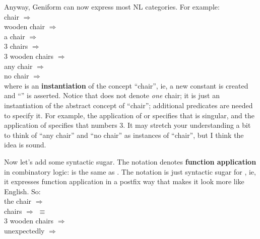 Anyway, Geniform can now express most NL categories.  For example:\\
\hspace*{1cm} chair $\Longrightarrow$ \\
\hspace*{1cm} wooden chair $\Longrightarrow$ \\
\hspace*{1cm} a chair $\Longrightarrow$ \\
\hspace*{1cm} 3 chairs $\Longrightarrow$ \\
\hspace*{1cm} 3 wooden chairs $\Longrightarrow$ \\
\hspace*{1cm} any chair $\Longrightarrow$ \\
\hspace*{1cm} no chair $\Longrightarrow$ \\
where  is an \textbf{instantiation} of the concept ``chair'', ie, a new constant  is created and ``'' is asserted.  Notice that  does not denote \textit{one} chair; it is just an instantiation of the abstract concept of ``chair''; additional predicates are needed to specify it.  For example, the application of  or  specifies that  is singular, and the application of  specifies that  numbers 3.  It may stretch your understanding a bit to think of ``any chair'' and ``no chair'' as instances of ``chair'', but I think the idea is sound.

Now let's add some syntactic sugar.  The notation  denotes \textbf{function application} in combinatory logic:   is the same as .  The notation  is just syntactic sugar for , ie, it expresses function application in a postfix way that makes it look more like English.  So:\\
\hspace*{1cm} the chair $\Longrightarrow$ \\
\hspace*{1cm} chairs $\Longrightarrow$  $\equiv$ \\
\hspace*{1cm} 3 wooden chairs $\Longrightarrow$ \\
\hspace*{1cm} unexpectedly $\Longrightarrow$ 

